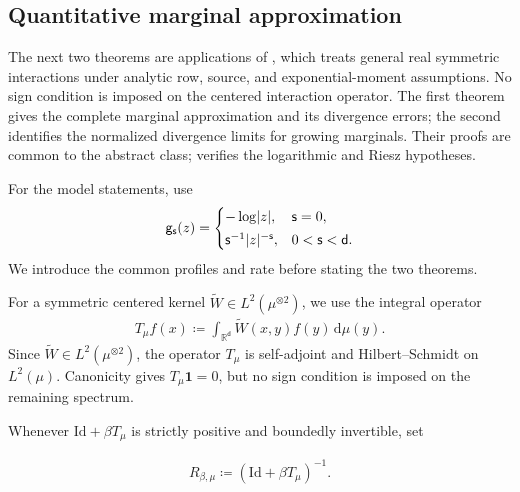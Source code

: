 \documentclass[11pt,reqno]{amsart}
\numberwithin{equation}{section}
\theoremstyle{plain}
\theoremstyle{remark}
\DeclarePairedDelimiter{\abs}{\lvert}{\rvert}
\renewcommand{\d}{\mathsf{d}}
\newcommand{\md}{\mathrm{d}}
\newcommand{\R}{{\mathbb{R}}}
\newcommand{\g}{{\mathsf{g}}}
\newcommand{\tl}{\widetilde}
\newcommand{\be}{\beta}
\newcommand{\s}{\mathsf{s}}
\newcommand{\Tc}{T_\mu}
\newcommand{\one}{\mathbf 1}
\begin{document}
\subsection{Quantitative marginal approximation}
\label{subsec:exact-fixed-marginal-profile}

The next two theorems are applications of , which treats general real symmetric interactions under analytic row, source, and exponential-moment assumptions.  No sign condition is imposed on the centered interaction operator.  The first theorem gives the complete marginal approximation and its divergence errors; the second identifies the normalized divergence limits for growing marginals.  Their proofs are common to the abstract class;  verifies the logarithmic and Riesz hypotheses.

For the model statements, use
\begin{align}\label{eq:intro-log-Riesz-kernel}
 \g_\s(z)
 =\begin{cases}
 -\log\abs{z}, & \s=0,\\[0.2em]
 \s^{-1}\abs{z}^{-\s}, & 0<\s<\d.
 \end{cases}
\end{align}
We introduce the common profiles and rate before stating the two theorems.

For a symmetric centered kernel $\tl W\in L^2(\mu^{\otimes2})$, we use the integral operator
\begin{align}\label{eq:T-def}
 \Tc f(x)\coloneqq \int_{\R^\d}\tl W(x,y)f(y)\,\md\mu(y).
\end{align}
Since \(\tl W\in L^2(\mu^{\otimes2})\), the operator \(\Tc\) is self-adjoint and Hilbert--Schmidt on \(L^2(\mu)\).  Canonicity gives \(\Tc\one=0\), but no sign condition is imposed on the remaining spectrum.

Whenever $\mathrm{Id}+\be T_\mu$ is strictly positive and boundedly invertible, set


\begin{align}\label{eq:weak-second-resolvent-def}
 R_{\be,\mu}\coloneqq(\mathrm{Id}+\be\Tc)^{-1}.
\end{align}
\end{document}
